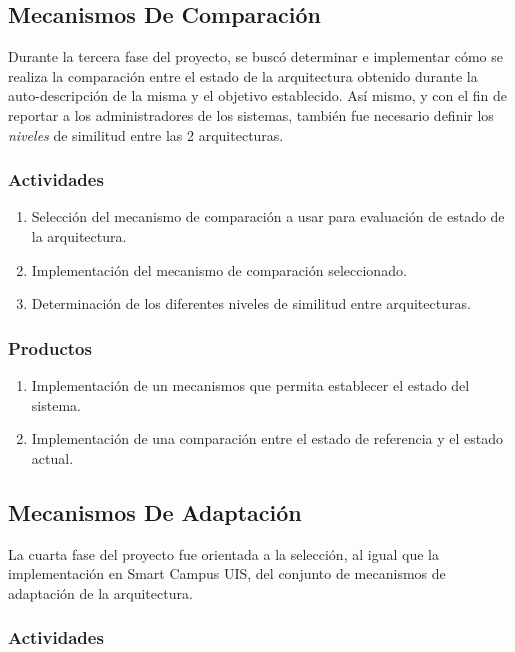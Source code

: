 \subsection{Mecanismos De Comparación}

Durante la tercera fase del proyecto, se buscó determinar e implementar cómo se realiza la comparación entre el estado de la arquitectura obtenido durante la auto-descripción de la misma y el objetivo establecido. Así mismo, y con el fin de reportar a los administradores de los sistemas, también fue necesario definir los \textit{niveles} de similitud entre las 2 arquitecturas.

\subsubsection*{Actividades}

\begin{enumerate}
    \itemsep-2mm
    \item Selección del mecanismo de comparación a usar para evaluación de estado de la arquitectura.
    \item Implementación del mecanismo de comparación seleccionado.
    \item Determinación de los diferentes niveles de similitud entre arquitecturas.
\end{enumerate}    

\subsubsection*{Productos}

\begin{enumerate}
    \itemsep-2mm
    \item Implementación de un mecanismos que permita establecer el estado del sistema.
    \item Implementación de una comparación entre el estado de referencia y el estado actual.
\end{enumerate}

\subsection{Mecanismos De Adaptación}

La cuarta fase del proyecto fue orientada a la selección, al igual que la implementación en Smart Campus UIS, del conjunto de mecanismos de adaptación de la arquitectura. 

\subsubsection*{Actividades}

